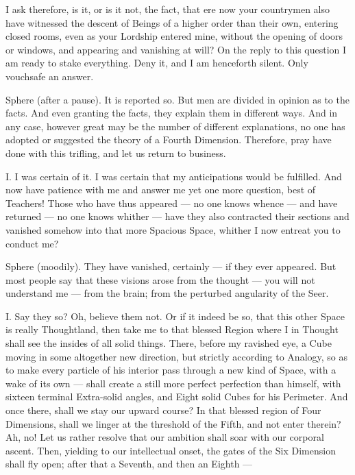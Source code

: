\documentclass[12pt, a4paper, twoside]{memoir}
\begin{document}
I ask therefore, is it, or is it not, the fact, that ere now your countrymen
also have witnessed the descent of Beings of a higher order than their own,
entering closed rooms, even as your Lordship entered mine, without the opening
of doors or windows, and appearing and vanishing at will? On the reply to this
question I am ready to stake everything. Deny it, and I am henceforth silent.
Only vouchsafe an answer.

Sphere (after a pause). It is reported so. But men are divided in opinion as
to the facts. And even granting the facts, they explain them in different
ways. And in any case, however great may be the number of different
explanations, no one has adopted or suggested the theory of a Fourth
Dimension. Therefore, pray have done with this trifling, and let us return to
business.

I. I was certain of it. I was certain that my anticipations would be
fulfilled. And now have patience with me and answer me yet one more question,
best of Teachers! Those who have thus appeared --- no one knows whence --- and
have returned --- no one knows whither --- have they also contracted their
sections and vanished somehow into that more Spacious Space, whither I now
entreat you to conduct me?

Sphere (moodily). They have vanished, certainly --- if they ever appeared. But
most people say that these visions arose from the thought --- you will not
understand me --- from the brain; from the perturbed angularity of the Seer.

I. Say they so? Oh, believe them not. Or if it indeed be so, that this other
Space is really Thoughtland, then take me to that blessed Region where I in
Thought shall see the insides of all solid things. There, before my ravished
eye, a Cube moving in some altogether new direction, but strictly according to
Analogy, so as to make every particle of his interior pass through a new kind
of Space, with a wake of its own --- shall create a still more perfect
perfection than himself, with sixteen terminal Extra-solid angles, and Eight
solid Cubes for his Perimeter. And once there, shall we stay our upward
course? In that blessed region of Four Dimensions, shall we linger at the
threshold of the Fifth, and not enter therein? Ah, no! Let us rather resolve
that our ambition shall soar with our corporal ascent. Then, yielding to our
intellectual onset, the gates of the Six Dimension shall fly open; after that
a Seventh, and then an Eighth ---
\end{document}
